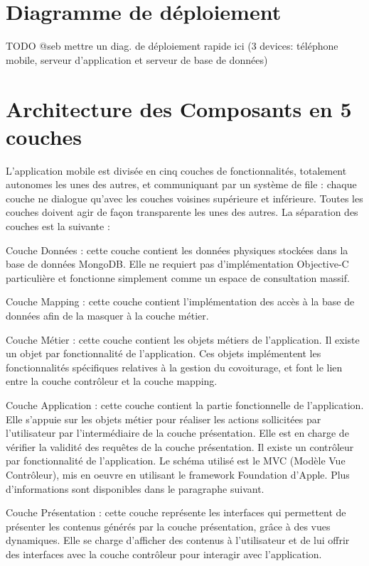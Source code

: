 \documentclass[a4paper,12pt]{report}
\begin{document}
\begin{onehalfspace}
\section{Diagramme de déploiement} %
\label{sec:diagramme_de_d_ploiement}
TODO @seb mettre un diag. de déploiement rapide ici (3 devices: téléphone mobile, serveur d'application et serveur de base de données)

\section{Architecture des Composants en 5 couches} %
\label{sec:architecture_des_composants_en_5_couches}

L’application mobile est divisée en cinq couches de fonctionnalités, totalement autonomes les unes des autres, et communiquant par un système de file : chaque couche ne dialogue qu’avec les couches voisines supérieure et inférieure. Toutes les couches doivent agir de façon transparente les unes des autres. La séparation des couches est la suivante :

Couche Données : cette couche contient les données physiques stockées dans la base de données MongoDB. Elle ne requiert pas d’implémentation Objective-C particulière et fonctionne simplement comme un espace de consultation massif.

Couche Mapping : cette couche contient l’implémentation des accès à la base de données afin de la masquer à la couche métier.

Couche Métier : cette couche contient les objets métiers de l’application. Il existe un objet par fonctionnalité de l’application. Ces objets implémentent les fonctionnalités spécifiques relatives à la gestion du covoiturage, et font le lien entre la couche contrôleur et la couche mapping.

Couche Application : cette couche contient la partie fonctionnelle de l’application. Elle s’appuie sur les objets métier pour réaliser les actions sollicitées par l’utilisateur par l’intermédiaire de la couche présentation. Elle est en charge de vérifier la validité des requêtes de la couche présentation. Il existe un contrôleur par fonctionnalité de l’application. Le schéma utilisé est le MVC (Modèle Vue Contrôleur), mis en oeuvre en utilisant le framework Foundation d'Apple. Plus d’informations sont disponibles dans le paragraphe suivant.

Couche Présentation : cette couche représente les interfaces qui permettent de présenter les contenus générés par la couche présentation, grâce à des vues dynamiques. Elle se charge d’afficher des contenus à l’utilisateur et de lui offrir des interfaces avec la couche contrôleur pour interagir avec l’application.


\end{onehalfspace}
\end{document}
